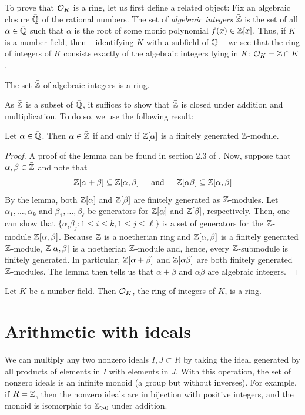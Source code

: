 \documentclass{book}
\begin{document}
To prove that $\mathcal{O}_K$ is a ring, let us first define a related object:  Fix
an algebraic closure $\bar{\mathbb{Q}}$ of the rational numbers.  The set of
\textit{algebraic integers} $\bar{\mathbb{Z}}$ is the set of all $\alpha \in \bar{\mathbb{Q}}$
such that $\alpha$ is the root of some monic polynomial $f(x) \in \mathbb{Z}[x]$.
Thus, if $K$ is a number field, then -- identifying $K$ with a subfield of
$\mathbb{Q}$ -- we see that the ring of integers of $K$ consists exactly of the
algebraic integers lying in $K$: $\mathcal{O}_K = \bar{\mathbb{Z}} \cap K$.
\begin{proposition}
The set $\bar{\mathbb{Z}}$ of algebraic integers is a ring.
\end{proposition}
As $\bar{\mathbb{Z}}$ is a subset of $\bar{\mathbb{Q}}$, it suffices to show that $\bar{\mathbb{Z}}$
is closed under addition and multiplication.  To do so, we use the following
result:
\begin{lemma}
Let $\alpha \in \bar{\mathbb{Q}}$.  Then $\alpha \in \bar{\mathbb{Z}}$ if and only if
$\mathbb{Z}[\alpha]$ is a finitely generated $\mathbb{Z}$-module.
\end{lemma}
\begin{proof}
A proof of the lemma can be found in section 2.3 of \cite{stein:ant}.  Now,
suppose that $\alpha, \beta \in \bar{\mathbb{Z}}$ and note that
$$
\mathbb{Z}[\alpha + \beta] \subseteq \mathbb{Z}[\alpha, \beta] \hspace{15pt}
  \text{and} \hspace{15pt} \mathbb{Z}[\alpha\beta] \subseteq \mathbb{Z}[\alpha, \beta]
$$
By the lemma, both $\mathbb{Z}[\alpha]$ and $\mathbb{Z}[\beta]$ are finitely generated as
$\mathbb{Z}$-modules.  Let $\alpha_1, \ldots, \alpha_k$ and
$\beta_1, \ldots, \beta_\ell$ be generators for $\mathbb{Z}[\alpha]$ and $\mathbb{Z}[\beta]$,
respectively.  Then, one can show that
$\{\alpha_i \beta_j: 1 \leq i \leq k, 1 \leq j \leq \ell\}$ is a set of
generators for the $\mathbb{Z}$-module $\mathbb{Z}[\alpha, \beta]$.  Because $\mathbb{Z}$ is a
noetherian ring and $\mathbb{Z}[\alpha, \beta]$ is a finitely generated $\mathbb{Z}$-module,
$\mathbb{Z}[\alpha,\beta]$ is a noetherian $\mathbb{Z}$-module and, hence, every $\mathbb{Z}$-submodule
is finitely generated.  In particular, $\mathbb{Z}[\alpha + \beta]$ and
$\mathbb{Z}[\alpha \beta]$ are both finitely generated $\mathbb{Z}$-modules.  The lemma then
tells us that $\alpha + \beta$ and $\alpha \beta$ are algebraic integers.
\end{proof}
\begin{corollary}
Let $K$ be a number field.  Then $\mathcal{O}_K$, the ring of integers of $K$, is a ring.
\end{corollary}


\section{Arithmetic with ideals}
We can multiply any two nonzero ideals $I, J\subset R$ by taking
the ideal generated by all products of elements in $I$ with elements
in $J$.  With this operation, the set of nonzero ideals is an infinite
monoid (a group but without inverses).
For example, if $R=\mathbb{Z}$, then the nonzero ideals are in
bijection with positive integers, and the monoid is isomorphic to
$\mathbb{Z}_{>0}$ under addition.
\end{document}
